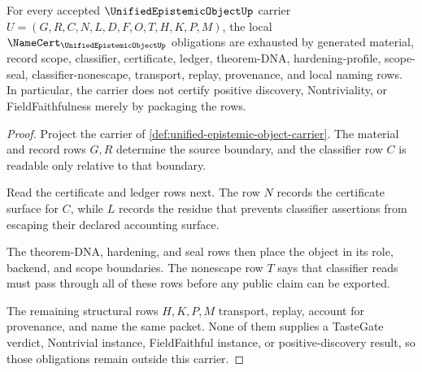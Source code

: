\begin{theorem}
\label{thm:unified-epistemic-object-namecert-obligations}
For every accepted $\UnifiedEpistemicObjectUp$ carrier $U=(G,R,C,N,L,D,F,O,T,H,K,P,M)$, the local $\NameCert_{\UnifiedEpistemicObjectUp}$ obligations are exhausted by generated material, record scope, classifier, certificate, ledger, theorem-DNA, hardening-profile, scope-seal, classifier-nonescape, transport, replay, provenance, and local naming rows. In particular, the carrier does not certify positive discovery, Nontriviality, or FieldFaithfulness merely by packaging the rows.
\end{theorem}
\begin{proof}
Project the carrier of \autoref{def:unified-epistemic-object-carrier}. The material and record rows $G,R$ determine the source boundary, and the classifier row $C$ is readable only relative to that boundary.

Read the certificate and ledger rows next. The row $N$ records the certificate surface for $C$, while $L$ records the residue that prevents classifier assertions from escaping their declared accounting surface.

The theorem-DNA, hardening, and seal rows then place the object in its role, backend, and scope boundaries. The nonescape row $T$ says that classifier reads must pass through all of these rows before any public claim can be exported.

The remaining structural rows $H,K,P,M$ transport, replay, account for provenance, and name the same packet. None of them supplies a TasteGate verdict, Nontrivial instance, FieldFaithful instance, or positive-discovery result, so those obligations remain outside this carrier.
\end{proof}

